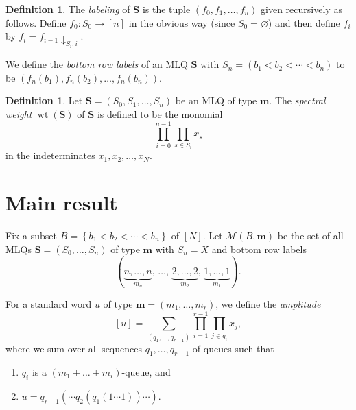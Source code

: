 \documentclass[submission]{FPSAC2018}
\newcommand{\fs}{\mathcal{S}} %
\newcommand{\0}{\phantom{c}}
\DeclareMathOperator{\wt}{wt} %
\newcommand{\xx}{\mathbf{x}}
\newcommand{\mm}{\mathbf{m}}
\newcommand{\MLQ}{\mathbf{S}}
\newcommand{\mcF}{\mathcal{F}}
\newcommand{\mcM}{\mathcal{M}}
\let\sumnonlimits\sum
\let\prodnonlimits\prod
\renewcommand{\sum}{\sumnonlimits\limits}
\renewcommand{\prod}{\prodnonlimits\limits}
\newcommand{\set}[1]{\left\{ #1 \right\}}
\newcommand{\tup}[1]{\left( #1 \right)}
\newcommand{\ive}[1]{\left[ #1 \right]}
\newcommand{\defn}[1]{{\color{darkred}\emph{#1}}} %
\theoremstyle{plain}
\theoremstyle{definition}
\newtheorem{dfn}[thm]{Definition}
\numberwithin{equation}{section}
\begin{document}
\begin{dfn}
The \defn{labeling} of $\MLQ$ is the tuple $(f_0, f_1, \dotsc, f_n)$ given recursively as follows.
Define $f_0 \colon S_0 \to \ive{n}$ in the obvious way (since $S_0 = \varnothing$) and then define $f_i$ by $f_i = f_{i-1} \downarrow_{S_i, i}$.

We define the \defn{bottom row labels} of an MLQ $\MLQ$ with $S_n = (b_1 < b_2 < \cdots < b_n)$ to be $\tup{f_n(b_1), f_n(b_2), \dotsc, f_n(b_n)}$.
\end{dfn}

\begin{dfn} \label{def.mlq.sw}
Let $\MLQ = \tup{S_0, S_1, \ldots, S_n}$ be an MLQ of type $\mm$.
The \defn{spectral weight} $\wt\tup{\MLQ}$
of $\MLQ$ is defined to be the monomial
\[
 \prod_{i=0}^{n-1} \prod_{s \in S_i} x_s
\]
in the indeterminates $x_1, x_2, \ldots, x_N$.
\end{dfn}


%

\section{Main result}
\label{sec:result}


Fix a subset $B = \set{b_1 < b_2 < \cdots < b_n}$ of $\ive{N}$.
Let $\mcM \tup{B, \mm}$ be the set of all MLQs $\MLQ = (S_0, \dotsc, S_n)$ of type $\mm$
with $S_n = X$ and bottom row labels
\[
(\underbrace{n, \dotsc, n}_{m_n},\, \dotsc,\, \underbrace{2, \dotsc, 2}_{m_2},\, \underbrace{1, \dotsc, 1}_{m_1}).
\]

For a standard word $u$ of type $\mm = (m_1, \dotsc, m_r)$, we define the \defn{amplitude} 
\[
  [u] = \sum_{(q_1, \dotsc, q_{r-1})} \prod_{i=1} ^{r-1} \prod_{j \in q_i} x_j,
\]
where we sum over all sequences $q_1, \dots, q_{r-1}$ of queues such that
\begin{enumerate}
\item $q_i$ is a $(m_1+\dots+m_i)$-queue, and
\item $u = q_{r-1}(\cdots q_2(q_1(1\dotsm 1)) \cdots)$.
\end{enumerate}
\end{document}
